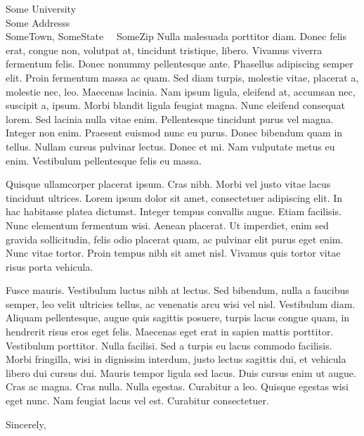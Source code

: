 \documentclass[12pt]{letter}
\begin{document}
\begin{letter}{
               Some University\\ 
               Some Addresss\\ 
               SomeTown, SomeState 					       				  		 ~~SomeZip
               }
Nulla malesuada porttitor diam. Donec felis erat, congue non, volutpat at, tincidunt tristique, libero. Vivamus viverra fermentum felis. Donec nonummy pellentesque ante. Phasellus adipiscing semper elit. Proin fermentum massa ac quam. Sed diam turpis, molestie vitae, placerat a, molestie nec, leo. Maecenas lacinia. Nam ipsum ligula, eleifend at, accumsan nec, suscipit a, ipsum. Morbi blandit ligula feugiat magna. Nunc eleifend consequat lorem. Sed lacinia nulla vitae enim. Pellentesque tincidunt purus vel magna. Integer non enim. Praesent euismod nunc eu purus. Donec bibendum quam in tellus. Nullam cursus pulvinar lectus. Donec et mi. Nam vulputate metus eu enim. Vestibulum pellentesque felis eu massa.

Quisque ullamcorper placerat ipsum. Cras nibh. Morbi vel justo vitae lacus tincidunt ultrices. Lorem ipsum dolor sit amet, consectetuer adipiscing elit. In hac habitasse platea dictumst. Integer tempus convallis augue. Etiam facilisis. Nunc elementum fermentum wisi. Aenean placerat. Ut imperdiet, enim sed gravida sollicitudin, felis odio placerat quam, ac pulvinar elit purus eget enim. Nunc vitae tortor. Proin tempus nibh sit amet nisl. Vivamus quis tortor vitae risus porta vehicula.

Fusce mauris. Vestibulum luctus nibh at lectus. Sed bibendum, nulla a faucibus semper, leo velit ultricies tellus, ac venenatis arcu wisi vel nisl. Vestibulum diam. Aliquam pellentesque, augue quis sagittis posuere, turpis lacus congue quam, in hendrerit risus eros eget felis. Maecenas eget erat in sapien mattis porttitor. Vestibulum porttitor. Nulla facilisi. Sed a turpis eu lacus commodo facilisis. Morbi fringilla, wisi in dignissim interdum, justo lectus sagittis dui, et vehicula libero dui cursus dui. Mauris tempor ligula sed lacus. Duis cursus enim ut augue. Cras ac magna. Cras nulla. Nulla egestas. Curabitur a leo. Quisque egestas wisi eget nunc. Nam feugiat lacus vel est. Curabitur consectetuer.

\closing{Sincerely,}




\end{letter}
\end{document}
